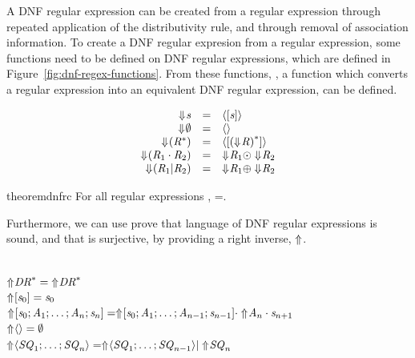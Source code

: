 \documentclass[numbers]{sigplanconf}
\begin{document}
A DNF regular expression can be created from a regular expression through repeated
application of the distributivity rule, and through removal of association information.
To create a DNF regular expresion from a regular expression,
some functions need to be defined on DNF regular expressions,
which are defined in Figure~\ref{fig:dnf-regex-functions}.
From these functions, \ToDNFRegex{}, a function which converts a regular expression into
an equivalent DNF regular expression, can be defined.

\begin{definition}
  \leavevmode
  \[
    \begin{array}{rcl}
      \ToDNFRegexOf{\String} & = & \DNFOf{\SequenceOf{\String}}\\
      \ToDNFRegexOf{\emptyset} & = & \DNFOf{}\\
      \ToDNFRegexOf{(\StarOf{\Regex})} & = & \DNFOf{\SequenceOf{\StarOf{(\ToDNFRegexOf{\Regex})}}}\\
      \ToDNFRegexOf{(\RegexConcat{\Regex_1}{\Regex_2})} & = & \ToDNFRegexOf{\Regex_1} \ConcatDNF \ToDNFRegexOf{\Regex_2}\\
      \ToDNFRegexOf{(\RegexOr{\Regex_1}{\Regex_2})} & = & \ToDNFRegexOf{\Regex_1} \OrDNF \ToDNFRegexOf{\Regex_2}\\
    \end{array}
  \]
\end{definition}
\begin{restatable}{theorem}{dnfrc}
  \label{thm:completeness-dnf-lenses}
  For all regular expressions \Regex{},
  \LanguageOf{\ToDNFRegex(\Regex)}=\LanguageOf{\Regex{}}.
\end{restatable}

Furthermore, we can use prove that language of DNF regular expressions is sound,
and that \ToDNFRegex{} is surjective, by providing a right inverse, $\Uparrow$.

\begin{definition}\leavevmode\\
  $\Uparrow\mkern-4mu {\mathit{DR}}^* = {\Uparrow\mkern-4mu \mathit{DR}}^*$\\
  $\Uparrow\mkern-4mu [\mathit{s}_0] = \mathit{s}_0$\\
  $\Uparrow\mkern-4mu [\mathit{s}_0;\mathit{A}_1;\ldots
    ;\mathit{A}_n;\mathit{s}_n] =
  \Uparrow\mkern-4mu [\mathit{s}_0;\mathit{A}_1;
    \ldots;\mathit{A}_{n-1};\mathit{s}_{n-1}]
  \cdot \Uparrow\mkern-4mu \mathit{A}_n \cdot \mathit{s}_{n+1}$\\
  $\Uparrow\mkern-4mu \langle\rangle=\emptyset$\\
  $\Uparrow\mkern-4mu \langle\mathit{SQ}_1;\ldots;\mathit{SQ}_n\rangle=
  \Uparrow\mkern-4mu \langle\mathit{SQ}_1;\ldots;\mathit{SQ}_{n-1}\rangle
  | \Uparrow\mkern-4mu \mathit{SQ}_n$
\end{definition}
\end{document}
